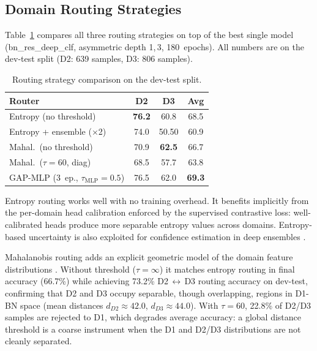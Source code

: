 \documentclass{article}
\begin{document}
\begin{sloppy}

\subsection{Domain Routing Strategies}
\label{ssec:routing_results}


Table~\ref{tab:routing} compares all three routing strategies on top of the
best single model (bn\_res\_deep\_clf, asymmetric depth 1,\,3, 180~epochs).
All numbers are on the dev-test split (D2: 639 samples, D3: 806 samples).

\begin{table}[t]
  \centering
  \caption{Routing strategy comparison on the dev-test split.}
  \label{tab:routing}
  \begin{tabularx}{\columnwidth}{Xccc}
    \toprule
    Router & D2 & D3 & Avg \\
    \midrule
    Entropy (no threshold)         & \textbf{76.2} & 60.8 & 68.5 \\
    Entropy + ensemble ($\times$2) & 74.0 & 50.50 & 60.9 \\
    Mahal.\ (no threshold)         & 70.9 & \textbf{62.5} & 66.7 \\
    Mahal.\ ($\tau=60$, diag)      & 68.5 & 57.7 & 63.8 \\
    GAP-MLP (3~ep., $\tau_\text{MLP}=0.5$) & 76.5 & 62.0 & \textbf{69.3} \\
    \bottomrule
  \end{tabularx}
\end{table}

\noindent Entropy routing works well with no training overhead.
It benefits implicitly from the per-domain head calibration enforced by the
supervised contrastive loss: well-calibrated heads produce more separable
entropy values across domains.  Entropy-based uncertainty is also exploited
for confidence estimation in deep ensembles \cite{lakshminarayanan2017ensembles}.

\noindent Mahalanobis routing adds an explicit geometric model of the
domain feature distributions \cite{lee2018mahalanobis}.  Without threshold
($\tau=\infty$) it matches entropy routing in final accuracy (66.7\%) while
achieving 73.2\% D2\,$\leftrightarrow$\,D3 routing accuracy on
dev-test, confirming that D2 and D3 occupy separable, though overlapping,
regions in D1-BN space (mean distances $d_{D2}\approx42.0$,
$d_{D3}\approx44.0$).  With $\tau=60$, 22.8\% of D2/D3 samples are rejected
to D1, which degrades average accuracy: a global distance threshold is a
coarse instrument when the D1 and D2/D3 distributions are not cleanly
separated.


\end{sloppy}
\end{document}
